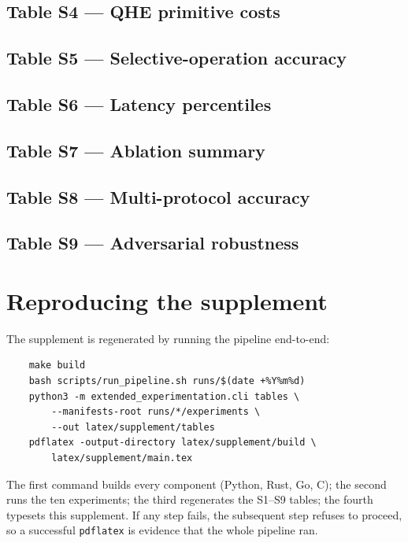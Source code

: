 \documentclass[11pt,a4paper]{article}
\begin{document}
\subsection*{Table S4 --- QHE primitive costs}


\subsection*{Table S5 --- Selective-operation accuracy}


\subsection*{Table S6 --- Latency percentiles}


\subsection*{Table S7 --- Ablation summary}


\subsection*{Table S8 --- Multi-protocol accuracy}


\subsection*{Table S9 --- Adversarial robustness}


\newpage

\appendix
\section{Reproducing the supplement}

The supplement is regenerated by running the pipeline end-to-end:

\begin{verbatim}
    make build
    bash scripts/run_pipeline.sh runs/$(date +%Y%m%d)
    python3 -m extended_experimentation.cli tables \
        --manifests-root runs/*/experiments \
        --out latex/supplement/tables
    pdflatex -output-directory latex/supplement/build \
        latex/supplement/main.tex
\end{verbatim}

\noindent
The first command builds every component (Python, Rust, Go, C); the
second runs the ten experiments; the third regenerates the S1--S9
tables; the fourth typesets this supplement. If any step fails, the
subsequent step refuses to proceed, so a successful \texttt{pdflatex}
is evidence that the whole pipeline ran.
\end{document}

